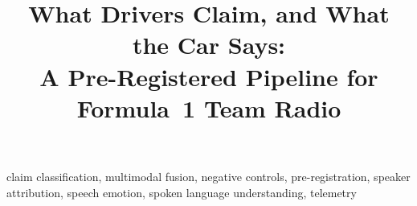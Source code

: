 \documentclass[conference]{IEEEtran}
\begin{document}
\title{What Drivers Claim, and What the Car Says:\\
A Pre-Registered Pipeline for Formula~1 Team Radio}

\author{
\and
{}
\and
{}
\and
{}
}

\maketitle



\begin{IEEEkeywords}
claim classification, multimodal fusion, negative controls, pre-registration, speaker attribution, speech emotion, spoken language understanding, telemetry
\end{IEEEkeywords}









\end{document}
